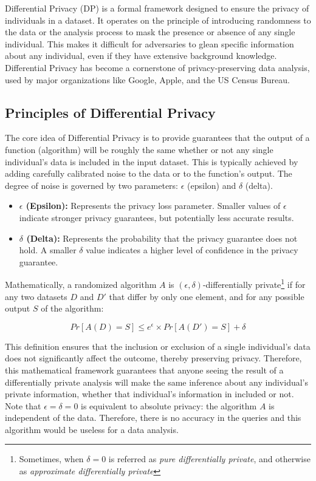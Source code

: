 Differential Privacy (DP) is a formal framework designed to ensure the privacy of individuals in a dataset. It operates on the principle of introducing randomness to the data or the analysis process to mask the presence or absence of any single individual. This makes it difficult for adversaries to glean specific information about any individual, even if they have extensive background knowledge. Differential Privacy has become a cornerstone of privacy-preserving data analysis, used by major organizations like Google, Apple, and the US Census Bureau.

\subsection{Principles of Differential Privacy}

The core idea of Differential Privacy is to provide guarantees that the output of a function (algorithm) will be roughly the same whether or not any single individual's data is included in the input dataset. This is typically achieved by adding carefully calibrated noise to the data or to the function's output. The degree of noise is governed by two parameters: $\epsilon$ (epsilon) and $\delta$ (delta).

\begin{itemize}
    \item \textbf{$\epsilon$ (Epsilon):} Represents the privacy loss parameter. Smaller values of $\epsilon$ indicate stronger privacy guarantees, but potentially less accurate results.
    \item \textbf{$\delta$ (Delta):} Represents the probability that the privacy guarantee does not hold. A smaller $\delta$ value indicates a higher level of confidence in the privacy guarantee.
\end{itemize}

Mathematically, a randomized algorithm $A$ is $(\epsilon, \delta)$-differentially private\footnote{Sometimes, when $\delta=0$ is referred as \textit{pure differentially private}, and otherwise as \textit{approximate differentially private} } if for any two datasets $D$ and $D'$ that differ by only one element, and for any possible output $S$ of the algorithm:

\[ Pr[A(D) = S] \leq e^\epsilon \times Pr[A(D') = S] + \delta \]

This definition ensures that the inclusion or exclusion of a single individual’s data does not significantly affect the outcome, thereby preserving privacy. Therefore, this mathematical framework guarantees that anyone seeing the result of a differentially private analysis will make the same inference about any individual's private information, whether that individual's information in included or not. \cite{wood2018}
Note that $\epsilon=\delta=0$ is equivalent to absolute privacy: the algorithm $A$ is independent of the data. Therefore, there is no accuracy in the queries and this algorithm would be useless for a data analysis.


